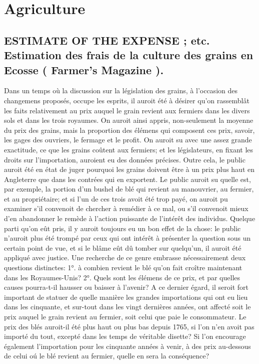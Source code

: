 \setcounter{page}{301}
\chapter{Agriculture}
\section{ESTIMATE OF THE EXPENSE ; etc. Estimation des frais de la culture des grains en Ecosse ( Farmer's Magazine ).}
Dans un temps où la discussion sur la législation des grains, à l'occasion des changemens proposés, occupe les esprits, il auroit été à désirer qu'on rassemblât les faits relativement au prix auquel le grain revient aux fermiers dans les divers sols et dans les trois royaumes. On auroit ainsi appris, non-seulement la moyenne du prix des grains, mais la proportion des élémens qui composent ces prix, savoir, les gages des ouvriers, le fermage et le profit. On auroit su avec une assez grande exactitude, ce que les grains coûtent aux fermiers; et les législateurs, en fixant les droits sur l'importation, auroient eu des données précises. Outre cela, le public auroit été en état de juger pourquoi les grains doivent être à un prix plus haut en Angleterre que dans les contrées qui en exportent. Le public auroit\setcounter{page}{302} su quelle est, par exemple, la portion d'un bushel de blé qui revient au manouvrier, au fermier, et au propriétaire; et si l'un de ces trois avoit été trop payé, on auroit pu examiner s'il convenoit de chercher à remédier à ce mal, ou s'il convenoit mieux d'en abandonner le remède à l'action puissante de l'intérêt des individus. Quelque parti qu'on eût pris, il y auroit toujours eu un bon effet de la chose: le public n'auroit plus été trompé par ceux qui ont intérêt à présenter la question sous un certain point de vue, et si le blâme eût dû tomber sur quelqu'un, il auroit été appliqué avec justice.
Une recherche de ce genre embrasse nécessairement deux questions distinctes: 1°. à combien revient le blé qu'on fait croître maintenant dans les Royaumes-Unis? 2°. Quels sont les élémens de ce prix, et par quelles causes pourra-t-il hausser ou baisser à l'avenir? A ce dernier égard, il seroit fort important de statuer de quelle manière les grandes importations qui ont eu lieu dans les cinquante, et sur-tout dans les vingt dernières années, ont affecté soit le prix auquel le grain revient au fermier, soit celui que paie le consommateur. Le prix des blés auroit-il été plus haut ou plus bas depuis\setcounter{page}{303} 1765, si l'on n'en avoit pas importé du tout, excepté dans les temps de véritable disette? Si l'on encourage également l'importation pour les cinquante années à venir, à des prix au-dessous de celui oú le blé revient au fermier, quelle en sera la conséquence?
